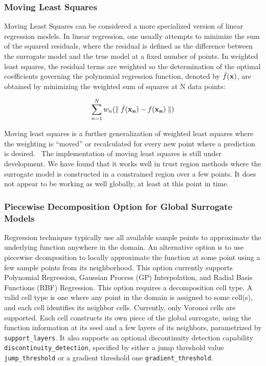\subsubsection{Moving Least Squares}\label{models:surf:mls}

Moving Least Squares can be considered a more specialized 
version of linear regression models.  In linear regression, 
one usually attempts to minimize the sum of the squared residuals, 
where the residual is defined as the difference between the 
surrogate model and the true model at a fixed number of points. 
In weighted least squares, the residual terms are weighted so the 
determination of the optimal coefficients governing the polynomial 
regression function, denoted by $\hat{f}({\bf x})$, are obtained by 
minimizing the weighted sum of squares at N data points: 

\begin{equation}
  \sum_{n=1}^{N}w_{n}({\parallel \hat{f}({\bf x_{n}})-f({\bf x_{n}})\parallel})
  \label{models:surf:equation12}  
\end{equation}

Moving least squares is a further generalization of weighted least squares
where the weighting is ``moved'' or recalculated for every new point where 
a prediction is desired.~\cite{Nea04}  The implementation of 
moving least squares 
is still under development.  We have found that it works well 
in trust region methods where the surrogate model is constructed in 
a constrained region over a few points.  It does not appear to be working 
as well globally, at least at this point in time.

\subsubsection{Piecewise Decomposition Option for Global Surrogate Models}\label{models:surf:piecewise_decomp}
Regression techniques typically use all available sample points to approximate the underlying function anywhere in the domain. An alternative option is to use piecewise dcomposition to locally approximate the function at some point using a few sample points from its neighborhood. This option currently supports Polynomial Regression, Gaussian Process (GP) Interpolation, and Radial Basis Functions (RBF) Regression. This option requires a decomposition cell type. A valid cell type is one where any point in the domain is assigned to some cell(s), and each cell identifies its neighbor cells. Currently, only Voronoi cells are supported. Each cell constructs its own piece of the global surrogate, using the function information at its seed and a few layers of its neighbors, parametrized by \texttt{support\_layers}. It also supports an optional discontinuity detection capability \texttt{discontinuity\_detection}, specified by either a jump threshold value \texttt{jump\_threshold} or a gradient threshold one \texttt{gradient\_threshold}. 


